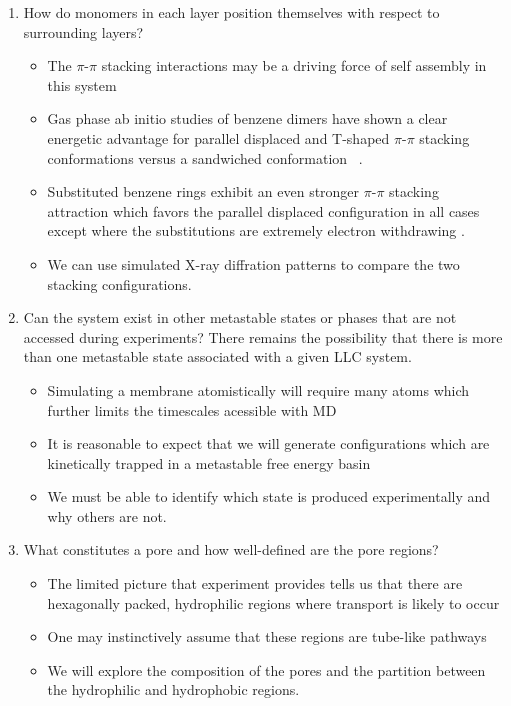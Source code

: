 \documentclass{article}
\begin{document}
\begin{enumerate}
   \item How do monomers in each layer position themselves with respect to surrounding 
   layers? \label{point:orientation}
   \begin{itemize}
      \item The $\pi$-$\pi$ stacking interactions may be a driving force of self assembly 
      in this system\cite{gazit_possible_2002} %
      \item Gas phase ab initio studies of benzene dimers have shown a clear energetic
      advantage for parallel displaced and T-shaped $\pi$-$\pi$ stacking conformations versus a
      sandwiched conformation ~\cite{sinnokrot_estimates_2002}.
      \item Substituted benzene rings exhibit an even stronger $\pi$-$\pi$ stacking 
      attraction which favors the parallel displaced configuration in all cases
      except where the substitutions are extremely electron withdrawing
      \cite{waller_hybrid_2006,ringer_effect_2006}.
      \item We can use simulated X-ray diffration patterns to compare the two 
      stacking configurations. 
   \end{itemize}

  \item Can the system exist in other metastable states or phases that are not
  accessed during experiments? \label{point:metastable}
  There remains the possibility that there is more than one metastable state 
  associated with a given LLC system.
  \begin{itemize}
    \item Simulating a membrane atomistically will require many atoms which further
    limits the timescales acessible with MD
    \item It is reasonable to expect that we will generate configurations which 
    are kinetically trapped in a metastable free energy basin
    \item We must be able to identify which state is produced experimentally and 
    why others are not.
  \end{itemize}

  \item What constitutes a pore and how well-defined are the pore regions? \label{point:poredefinition}
  \begin{itemize}
	\item The limited picture that experiment provides tells us that there are
        hexagonally packed, hydrophilic regions where transport is likely to occur
	\item One may instinctively assume that these regions are tube-like pathways
	\item We will explore the composition of the pores and the partition
	between the hydrophilic and hydrophobic regions. 
  \end{itemize}


\end{enumerate}
\end{document}
